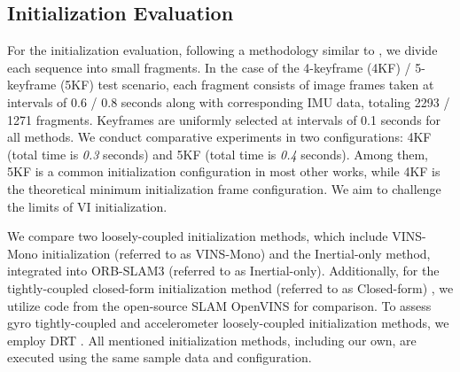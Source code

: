 \subsection{Initialization Evaluation}
For the initialization evaluation, following a methodology similar to \cite{Mono-Depth-VI-Init-2022}, we divide each sequence into small fragments. In the case of the 4-keyframe (4KF) / 5-keyframe (5KF) test scenario, each fragment consists of image frames taken at intervals of 0.6 / 0.8 seconds along with corresponding IMU data, totaling 2293 / 1271 fragments. Keyframes are uniformly selected at intervals of 0.1 seconds for all methods. We conduct comparative experiments in two configurations: 4KF (total time is \textit{0.3} seconds) and 5KF (total time is \textit{0.4} seconds). Among them, 5KF is a common initialization configuration in most other works, while 4KF is the theoretical minimum initialization frame configuration. We aim to challenge the limits of VI initialization.

We compare two loosely-coupled initialization methods, which include VINS-Mono initialization (referred to as VINS-Mono) \cite{qin-tro-2018_VINS-Mono} and the Inertial-only method\cite{campos2020inertial}, integrated into ORB-SLAM3 \cite{campos2021orb-slam3} (referred to as Inertial-only). Additionally, for the tightly-coupled closed-form initialization method (referred to as Closed-form) \cite{martinelli2014closed}, we utilize code from the open-source SLAM OpenVINS \cite{geneva2020openvins} for comparison. To assess gyro tightly-coupled and accelerometer loosely-coupled initialization methods, we employ DRT \cite{Rotation-Translation-Decoupled}. All mentioned initialization methods, including our own, are executed using the same sample data and configuration.

